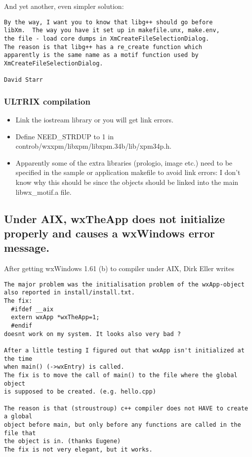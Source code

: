 And yet another, even simpler solution:

\begin{verbatim}
By the way, I want you to know that libg++ should go before 
libXm.  The way you have it set up in makefile.unx, make.env,
the file - load core dumps in XmCreateFileSelectionDialog.
The reason is that libg++ has a re_create function which 
apparently is the same name as a motif function used by
XmCreateFileSelectionDialog.

David Starr
\end{verbatim}

\subsubsection{ULTRIX compilation}

\begin{itemize}\itemsep=0pt
\item Link the iostream library or you will get link errors.
\item Define NEED\_STRDUP to 1 in controb/wxxpm/libxpm/libxpm.34b/lib/xpm34p.h.
\item Apparently some of the extra libraries (prologio, image etc.) need to be specified
in the sample or application makefile to avoid link errors: I don't know why this should be
since the objects should be linked into the main libwx\_motif.a file.
\end{itemize}

\subsection{Under AIX, wxTheApp does not initialize properly and causes a wxWindows error message.}

After getting wxWindows 1.61 (b) to compiler under AIX, Dirk Eller writes

\begin{verbatim}
The major problem was the initialisation problem of the wxApp-object
also reported in install/install.txt.
The fix:
  #ifdef __aix
  extern wxApp *wxTheApp=1;
  #endif
doesnt work on my system. It looks also very bad ?

After a little testing I figured out that wxApp isn't initialized at the time
when main() (->wxEntry) is called.
The fix is to move the call of main() to the file where the global object
is supposed to be created. (e.g. hello.cpp)

The reason is that (stroustroup) c++ compiler does not HAVE to create a global
object before main, but only before any functions are called in the file that
the object is in. (thanks Eugene)
The fix is not very elegant, but it works. 
\end{verbatim}


